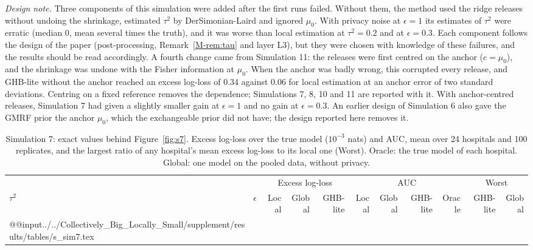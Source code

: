 \documentclass[acmsmall,screen,nonacm]{acmart}
\theoremstyle{acmdefinition}
\begin{document}
\emph{Design note.} Three components of this simulation were added after the first runs failed. Without them, the method used the ridge releases without undoing the shrinkage, estimated $\tau^2$ by DerSimonian-Laird \cite{dersimonian1986meta} and ignored $\mu_0$. With privacy noise at $\epsilon=1$ its estimates of $\tau^2$ were erratic (median 0, mean several times the truth), and it was worse than local estimation at $\tau^2=0.2$ and at $\epsilon=0.3$. Each component follows the design of the paper (post-processing, Remark~\ref{M-rem:tau} and layer L3), but they were chosen with knowledge of these failures, and the results should be read accordingly. A fourth change came from Simulation 11: the releases were first centred on the anchor ($c=\mu_0$), and the shrinkage was undone with the Fisher information at $\mu_0$. When the anchor was badly wrong, this corrupted every release, and GHB-lite without the anchor reached an excess log-loss of 0.34 against 0.06 for local estimation at an anchor error of two standard deviations. Centring on a fixed reference removes the dependence; Simulations 7, 8, 10 and 11 are reported with it. With anchor-centred releases, Simulation 7 had given a slightly smaller gain at $\epsilon=1$ and no gain at $\epsilon=0.3$. An earlier design of Simulation 6 also gave the GMRF prior the anchor $\mu_0$, which the exchangeable prior did not have; the design reported here removes it.

\begin{table}[t]
\caption{Simulation 7: exact values behind Figure~\ref{fig:s7}. Excess log-loss over the true model ($10^{-3}$ nats) and AUC, mean over 24 hospitals and 100 replicates, and the largest ratio of any hospital's mean excess log-loss to its local one (Worst). Oracle: the true model of each hospital. Global: one model on the pooled data, without privacy.}
\label{tab:s7}
\scriptsize
\setlength{\tabcolsep}{4pt}
\begin{tabular}{@{}llrrrrrrrrr@{}}
\toprule
 & & \multicolumn{3}{c}{Excess log-loss} & \multicolumn{4}{c}{AUC} & \multicolumn{2}{c}{Worst}\\
\cmidrule(lr){3-5}\cmidrule(lr){6-9}\cmidrule(l){10-11}
$\tau^2$ & $\epsilon$ & Local & Global & GHB-lite & Local & Global & GHB-lite & Oracle & GHB-lite & Global\\
\midrule
\csname @@input\endcsname../../Collectively_Big_Locally_Small/supplement/results/tables/s_sim7.tex 
\bottomrule
\end{tabular}
\end{table}
\end{document}
